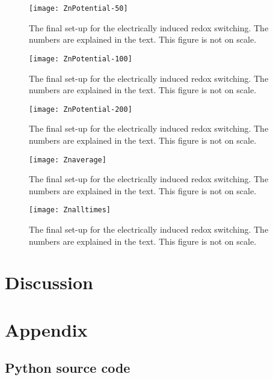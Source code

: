 \documentclass[twoside,single]{lion-msc}
\begin{document}
\begin{figure}[ht!]
\centering
\texttt{[image: ZnPotential-50]}
\caption{The final set-up for the electrically induced redox switching. The numbers are explained in the text. This figure is not on scale.}
\label{final_setup}
\end{figure}

\begin{figure}[ht!]
\centering
\texttt{[image: ZnPotential-100]}
\caption{The final set-up for the electrically induced redox switching. The numbers are explained in the text. This figure is not on scale.}
\label{final_setup}
\end{figure}

\begin{figure}[ht!]
\centering
\texttt{[image: ZnPotential-200]}
\caption{The final set-up for the electrically induced redox switching. The numbers are explained in the text. This figure is not on scale.}
\label{final_setup}
\end{figure}

\begin{figure}[ht!]
\centering
\texttt{[image: Znaverage]}
\caption{The final set-up for the electrically induced redox switching. The numbers are explained in the text. This figure is not on scale.}
\label{final_setup}
\end{figure}

\begin{figure}[ht!]
\centering
\texttt{[image: Znalltimes]}
\caption{The final set-up for the electrically induced redox switching. The numbers are explained in the text. This figure is not on scale.}
\label{final_setup}
\end{figure}

\chapter{Discussion}

\chapter{Appendix}

\section{Python source code}\label{app_1}


\fi
\end{document}
